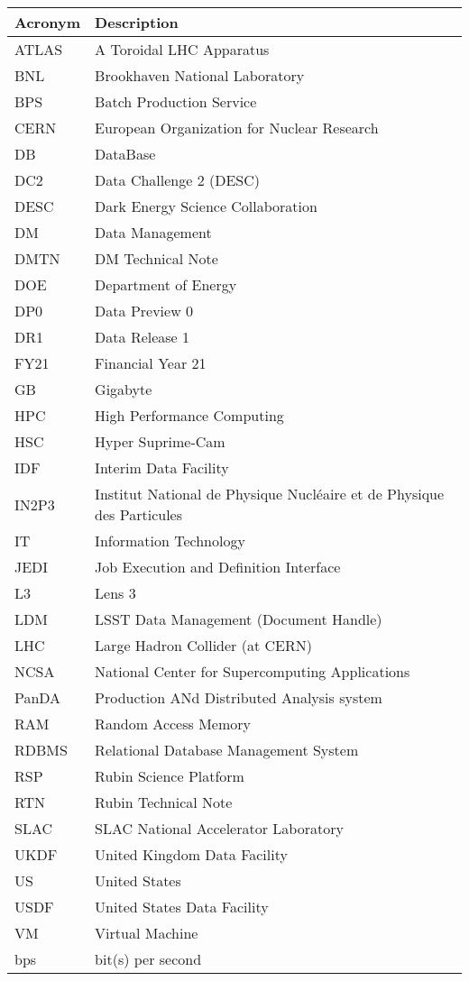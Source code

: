 \addtocounter{table}{-1}
\begin{longtable}{p{}p{}}\hline
\textbf{Acronym} & \textbf{Description}  \\\hline

ATLAS & A Toroidal LHC Apparatus \\\hline
BNL & Brookhaven National Laboratory \\\hline
BPS & Batch Production Service \\\hline
CERN & European Organization for Nuclear Research \\\hline
DB & DataBase \\\hline
DC2 & Data Challenge 2 (DESC) \\\hline
DESC & Dark Energy Science Collaboration \\\hline
DM & Data Management \\\hline
DMTN & DM Technical Note \\\hline
DOE & Department of Energy \\\hline
DP0 & Data Preview 0 \\\hline
DR1 & Data Release 1 \\\hline
FY21 & Financial Year 21 \\\hline
GB & Gigabyte \\\hline
HPC & High Performance Computing \\\hline
HSC & Hyper Suprime-Cam \\\hline
IDF & Interim Data Facility \\\hline
IN2P3 & Institut National de Physique Nucléaire et de Physique des Particules \\\hline
IT & Information Technology \\\hline
JEDI & Job Execution and Definition Interface \\\hline
L3 & Lens 3 \\\hline
LDM & LSST Data Management (Document Handle) \\\hline
LHC & Large Hadron Collider (at CERN) \\\hline
NCSA & National Center for Supercomputing Applications \\\hline
PanDA &  Production ANd Distributed Analysis system \\\hline
RAM & Random Access Memory \\\hline
RDBMS & Relational Database Management System  \\\hline
RSP & Rubin Science Platform \\\hline
RTN & Rubin Technical Note \\\hline
SLAC & SLAC National Accelerator Laboratory \\\hline
UKDF & United Kingdom Data Facility \\\hline
US & United States \\\hline
USDF & United States Data Facility \\\hline
VM & Virtual Machine \\\hline
bps & bit(s) per second \\\hline
\end{longtable}
